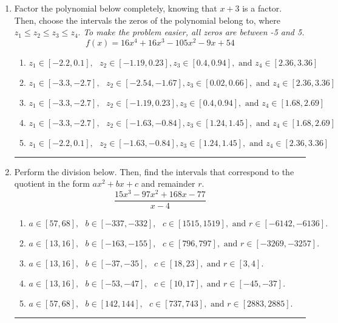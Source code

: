 \documentclass[14pt]{extbook}
\newcommand{\litem}[1]{\item#1\hspace*{-1cm}\rule{\textwidth}{0.4pt}}
\begin{document}
\begin{enumerate}
\litem{
Factor the polynomial below completely, knowing that $x + 3$ is a factor. Then, choose the intervals the zeros of the polynomial belong to, where $z_1 \leq z_2 \leq z_3 \leq z_4$. \textit{To make the problem easier, all zeros are between -5 and 5.}\[ f(x) = 16x^{4} +16 x^{3} -105 x^{2} -9 x + 54 \]\begin{enumerate}[label=\Alph*.]
\item \( z_1 \in [-2.2, 0.1], \text{   }  z_2 \in [-1.19, 0.23], z_3 \in [0.4, 0.94], \text{   and   } z_4 \in [2.36, 3.36] \)
\item \( z_1 \in [-3.3, -2.7], \text{   }  z_2 \in [-2.54, -1.67], z_3 \in [0.02, 0.66], \text{   and   } z_4 \in [2.36, 3.36] \)
\item \( z_1 \in [-3.3, -2.7], \text{   }  z_2 \in [-1.19, 0.23], z_3 \in [0.4, 0.94], \text{   and   } z_4 \in [1.68, 2.69] \)
\item \( z_1 \in [-3.3, -2.7], \text{   }  z_2 \in [-1.63, -0.84], z_3 \in [1.24, 1.45], \text{   and   } z_4 \in [1.68, 2.69] \)
\item \( z_1 \in [-2.2, 0.1], \text{   }  z_2 \in [-1.63, -0.84], z_3 \in [1.24, 1.45], \text{   and   } z_4 \in [2.36, 3.36] \)

\end{enumerate} }
\litem{
Perform the division below. Then, find the intervals that correspond to the quotient in the form $ax^2+bx+c$ and remainder $r$.\[ \frac{15x^{3} -97 x^{2} +168 x -77}{x -4} \]\begin{enumerate}[label=\Alph*.]
\item \( a \in [57, 68], \text{   } b \in [-337, -332], \text{   } c \in [1515, 1519], \text{   and   } r \in [-6142, -6136]. \)
\item \( a \in [13, 16], \text{   } b \in [-163, -155], \text{   } c \in [796, 797], \text{   and   } r \in [-3269, -3257]. \)
\item \( a \in [13, 16], \text{   } b \in [-37, -35], \text{   } c \in [18, 23], \text{   and   } r \in [3, 4]. \)
\item \( a \in [13, 16], \text{   } b \in [-53, -47], \text{   } c \in [10, 17], \text{   and   } r \in [-45, -37]. \)
\item \( a \in [57, 68], \text{   } b \in [142, 144], \text{   } c \in [737, 743], \text{   and   } r \in [2883, 2885]. \)


\end{enumerate}}
\end{enumerate}
\end{document}
